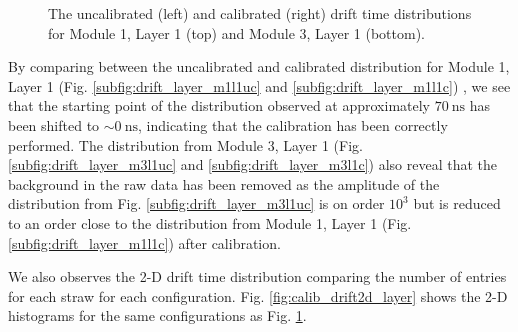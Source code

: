 \documentclass[a4paper]{report}
\numberwithin{equation}{section}
\begin{document}
\begin{figure}[htb!]
	\caption{The uncalibrated (left) and calibrated (right) drift time 
	distributions for Module 1, Layer 1 (top) and Module 3, Layer 1 (bottom).}
	\label{fig:calib_drift_layer}
\end{figure}

By comparing between the uncalibrated and calibrated distribution for Module 1, Layer 1 (Fig. \ref{subfig:drift_layer_m1l1uc} and \ref{subfig:drift_layer_m1l1c})
, we see that the starting point of the distribution observed at approximately $\SI{70}{\nano\second}$ has been shifted to $\sim \SI{0}{\nano\second}$, 
indicating that the calibration has been correctly performed. The distribution from Module 3, Layer 1 (Fig. \ref{subfig:drift_layer_m3l1uc}
and \ref{subfig:drift_layer_m3l1c}) also reveal that the background in the raw data has been removed as the amplitude of the distribution 
from Fig. \ref{subfig:drift_layer_m3l1uc} is on order $10^3$ but is reduced to an order close to the distribution from 
Module 1, Layer 1 (Fig. \ref{subfig:drift_layer_m1l1c}) after calibration. \par

We also observes the 2-D drift time distribution comparing the number of entries for each straw for each configuration. Fig. \ref{fig:calib_drift2d_layer} shows the 
2-D histograms for the same configurations as Fig. \ref{fig:calib_drift_layer}. 
\end{document}
